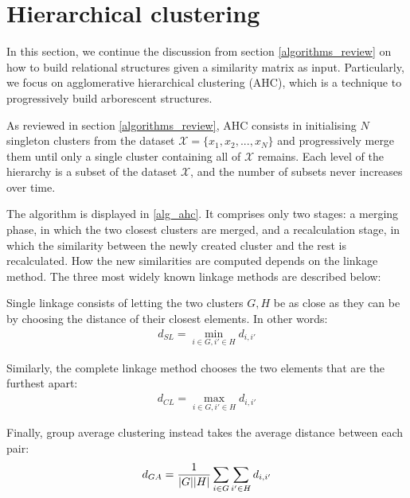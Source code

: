 \documentclass[../main.tex]{subfiles}
\begin{document}
\section{Hierarchical clustering} \label{section_hierarchical}
In this section, we continue the discussion from section \ref{algorithms_review} on how to build relational structures given a similarity matrix as input. Particularly, we focus on agglomerative hierarchical clustering (AHC), which is a technique to progressively build arborescent structures.
\par As reviewed in section \ref{algorithms_review}, AHC consists in initialising $N$ singleton clusters from the dataset $\mathcal{X} = \{x_1, x_2, ..., x_N\}$ and progressively merge them until only a single cluster containing all of $\mathcal{X}$ remains. Each level of the hierarchy is a subset of the dataset $\mathcal{X}$, and the number of subsets never increases over time.
\par The algorithm is displayed in \ref{alg_ahc}. It comprises only two stages: a merging phase, in which the two closest clusters are merged, and a recalculation stage, in which the similarity between the newly created cluster and the rest is recalculated. How the new similarities are computed depends on the linkage method. The three most widely known linkage methods \cite{hastie2008} are described below:
\par Single linkage consists of letting the two clusters $G, H$ be as close as they can be by choosing the distance of their closest elements. In other words:
\begin{align*}
d_{SL} = \min_{i \in G, i' \in H} d_{i, i'}
\end{align*}
\par Similarly, the complete linkage method chooses the two elements that are the furthest apart:
\begin{align*}
d_{CL} = \max_{i \in G, i' \in H} d_{i, i'}
\end{align*}
\par Finally, group average clustering instead takes the average distance between each pair:
\begin{align*}
d_{GA} = \frac{1}{\lvert G\rvert\lvert H\rvert}\sum_{i\in G}\sum_{i'\in H}d_{i, i'}
\end{align*}
\end{document}
